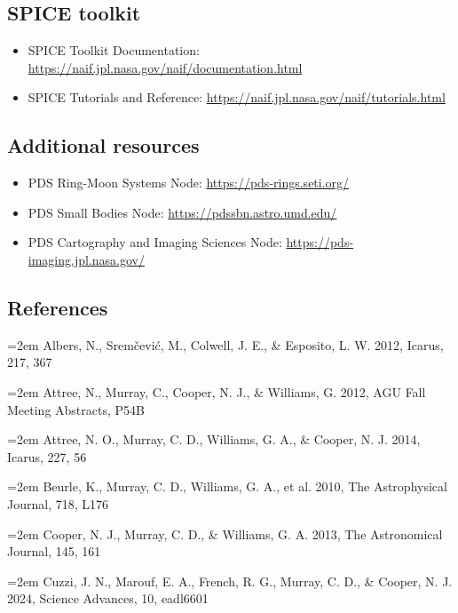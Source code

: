 \subsection{SPICE toolkit}
\label{sec:spice-toolkit}

\begin{itemize}
\item SPICE Toolkit Documentation: \url{https://naif.jpl.nasa.gov/naif/documentation.html}
\item SPICE Tutorials and Reference: \url{https://naif.jpl.nasa.gov/naif/tutorials.html}
\end{itemize}

\subsection{Additional resources}
\label{sec:additional-resources}

\begin{itemize}
\item PDS Ring-Moon Systems Node: \url{https://pds-rings.seti.org/}
\item PDS Small Bodies Node: \url{https://pdssbn.astro.umd.edu/}
\item PDS Cartography and Imaging Sciences Node: \url{https://pds-imaging.jpl.nasa.gov/}
\end{itemize}

\clearpage

\subsection{References}
\label{sec:references}

\noindent\hangindent=2em Albers, N., Sremčević, M., Colwell, J. E., \& Esposito, L. W. 2012, Icarus, 217, 367

\noindent\hangindent=2em Attree, N., Murray, C., Cooper, N. J., \& Williams, G. 2012, AGU Fall Meeting Abstracts, P54B

\noindent\hangindent=2em Attree, N. O., Murray, C. D., Williams, G. A., \& Cooper, N. J. 2014, Icarus, 227, 56

\noindent\hangindent=2em Beurle, K., Murray, C. D., Williams, G. A., et al. 2010, The Astrophysical Journal, 718, L176

\noindent\hangindent=2em Cooper, N. J., Murray, C. D., \& Williams, G. A. 2013, The Astronomical Journal, 145, 161

\noindent\hangindent=2em Cuzzi, J. N., Marouf, E. A., French, R. G., Murray, C. D., \& Cooper, N. J. 2024, Science Advances, 10, eadl6601

